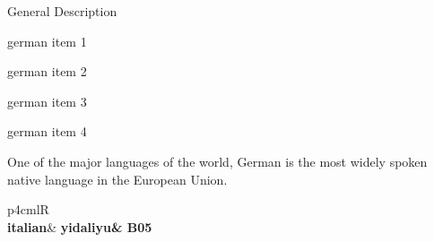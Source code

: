 \documentclass[UTF8]{article}
\begin{document}
                            General Description\\[-20pt]
            \begin{itemize}
                \setlength{\itemsep}{0pt}
                \setlength{\parskip}{0pt}
                \setlength{\parsep}{0pt}
                \small{
                                    \item german item 1
                                    \item german item 2
                                    \item german item 3
                                    \item german item 4
                                }
                \vspace*{5pt}
                \item One of the major languages of the world, German is the most widely spoken native language in the European Union.
            \end{itemize}
                    \begin{tabularx}{\textwidth}{p{4cm}lR}
            \hline\\[-15pt]
            \large{\bfseries{italian}}&
            \bfseries{\small{yidaliyu}}&
            \hfill\bfseries{B05}\\[10pt]
            \\[5pt]
            \hdashline[10pt/5pt]\\
        \end{tabularx}\\[-10pt]
\end{document}

